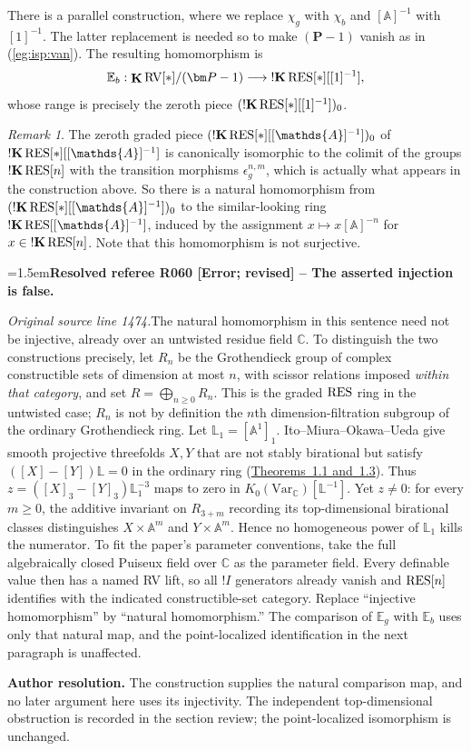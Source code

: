 \documentclass[12pt]{amsart}
\newcommand{\ResolvedRefereeRemark}[5]{%
  \par\medskip\begingroup\normalfont\small\color{gray}%
  \emergencystretch=1.5em\noindent\textbf{Resolved referee R#1 [#2] -- #3.}\par\nobreak\noindent #4\par
  \medskip\color{ResolutionGreen}\noindent\textbf{Author resolution.} #5\par
  \endgroup\medskip
}
\theoremstyle{plain}
\theoremstyle{definition}
\theoremstyle{remark}
\newtheorem{rem}[thm]{Remark}
\numberwithin{equation}{section}
\theoremstyle{plain}
\newcommand{\RV}{\textup{RV}}
\newcommand{\A}{\mathds{A}}
\newcommand{\0}{\emptyset}
\newcommand{\bb}[1]{\mathbb{#1}}
\newcommand{\fun}{\longrightarrow}
\newcommand{\efun}{\longmapsto}
\newcommand{\RES}{\textup{RES}}
\DeclareMathOperator{\ggk}{\mathbf{K}}
\DeclareMathOperator{\sggk}{!\mathbf{K}}
\begin{document}
There is a parallel construction, where  we replace $\chi_g$ with $\chi_b$ and $[\A]^{-1}$ with $[1]^{-1}$. The latter replacement is needed so to make $(\bm P - 1)$ vanish as in (\ref{eg:isp:van}). The resulting homomorphism is
\begin{equation}\label{EB}
\bb E_b : \ggk \RV[*] / (\bm P - 1) \fun \sggk \RES[*][[1]^{-1}],
\end{equation}
whose range is precisely the zeroth piece  $(\sggk \RES[*][[1]^{-1}])_0$.

\begin{rem}\label{eb:no:eg}
The zeroth graded piece $(\sggk \RES[*][[\A]^{-1}])_0$ of $\sggk \RES[*][[\A]^{-1}]$ is canonically isomorphic to the colimit  of the groups $\sggk \RES[n]$ with the transition morphisms $\epsilon^{n,m}_g $, which is actually what appears in the construction above. So there is a natural homomorphism from $(\sggk \RES[*][[\A]^{-1}])_0$ to the similar-looking ring $\sggk \RES[[\A]^{-1}]$, induced by the assignment $x \efun x[\A]^{-n}$ for $x \in \sggk \RES[n]$. Note that this homomorphism is not surjective.

\ResolvedRefereeRemark{060}{Error; revised}{The asserted injection is false}{%
\textit{Original source line 1474.}\quad The natural homomorphism in this sentence need not be injective, already over an untwisted residue field $\mathbb C$. To distinguish the two constructions precisely, let $R_n$ be the Grothendieck group of complex constructible sets of dimension at most $n$, with scissor relations imposed \emph{within that category}, and set $R=\bigoplus_{n\geq0}R_n$. This is the graded $\RES$ ring in the untwisted case; $R_n$ is not by definition the $n$th dimension-filtration subgroup of the ordinary Grothendieck ring. Let $\mathbb L_1=[\mathbb A^1]_1$. Ito--Miura--Okawa--Ueda give smooth projective threefolds $X,Y$ that are not stably birational but satisfy $([X]-[Y])\mathbb L=0$ in the ordinary ring (\href{https://arxiv.org/pdf/1606.04210}{Theorems~1.1 and~1.3}). Thus $z=([X]_3-[Y]_3)\mathbb L_1^{-3}$ maps to zero in $K_0(\mathrm{Var}_{\mathbb C})[\mathbb L^{-1}]$. Yet $z\neq0$: for every $m\geq0$, the additive invariant on $R_{3+m}$ recording its top-dimensional birational classes distinguishes $X\times\mathbb A^m$ and $Y\times\mathbb A^m$. Hence no homogeneous power of $\mathbb L_1$ kills the numerator. To fit the paper's parameter conventions, take the full algebraically closed Puiseux field over $\mathbb C$ as the parameter field. Every definable value then has a named RV lift, so all $!I$ generators already vanish and $\RES[n]$ identifies with the indicated constructible-set category. Replace ``injective homomorphism'' by ``natural homomorphism.'' The comparison of $\mathbb E_g$ with $\mathbb E_b$ uses only that natural map, and the point-localized identification in the next paragraph is unaffected.
}{The construction supplies the natural comparison map, and no later argument here uses its injectivity. The independent top-dimensional obstruction is recorded in the section review; the point-localized isomorphism is unchanged.}


\end{rem}
\end{document}
